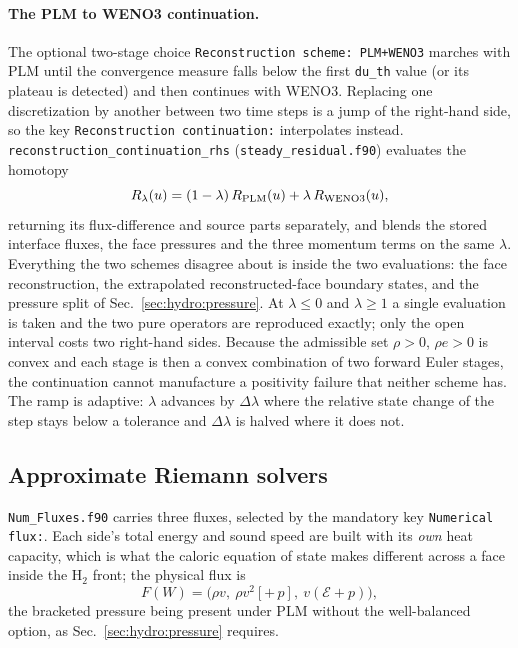 \paragraph{The PLM to WENO3 continuation.}
The optional two-stage choice \texttt{Reconstruction scheme: PLM+WENO3} marches with
PLM until the convergence measure falls below the first \texttt{du\_th} value
(or its plateau is detected) and then continues with WENO3.  Replacing one
discretization by another between two time steps is a jump of the right-hand
side, so the key \texttt{Reconstruction continuation:} interpolates instead.
\texttt{reconstruction\_continuation\_rhs} (\texttt{steady\_residual.f90})
evaluates the homotopy
%
\begin{equation}
  R_\lambda(u) = (1-\lambda)\,R_{\rm PLM}(u) + \lambda\,R_{\rm WENO3}(u),
  \label{eq:homotopy}
\end{equation}
%
returning its flux-difference and source parts separately, and blends the
stored interface fluxes, the face pressures and the three momentum terms on
the same $\lambda$.  Everything the two schemes disagree about is inside the
two evaluations: the face reconstruction, the extrapolated reconstructed-face
boundary states, and the pressure split of Sec.~\ref{sec:hydro:pressure}.
At $\lambda \le 0$ and $\lambda \ge 1$ a single evaluation is taken and the
two pure operators are reproduced exactly; only the open interval costs two
right-hand sides.  Because the admissible set $\rho>0$, $\rho e>0$ is convex
and each stage is then a convex combination of two forward Euler stages, the
continuation cannot manufacture a positivity failure that neither scheme has.
The ramp is adaptive: $\lambda$ advances by $\Delta\lambda$ where the relative
state change of the step stays below a tolerance and $\Delta\lambda$ is halved
where it does not.

\subsection{Approximate Riemann solvers}
\label{sec:numerics:riemann}

\texttt{Num\_Fluxes.f90} carries three fluxes, selected by the mandatory key
\texttt{Numerical flux:}.  Each side's total energy and sound speed are built
with its \emph{own} heat capacity, which is what the caloric equation of state
makes different across a face inside the $\mathrm{H}_2$ front; the physical
flux is
%
\begin{equation}
  F(W) = \bigl(\rho v,\ \rho v^2 [+\,p],\ v(\mathcal{E}+p)\bigr),
  \label{eq:physflux}
\end{equation}
%
the bracketed pressure being present under PLM without the well-balanced
option, as Sec.~\ref{sec:hydro:pressure} requires.

